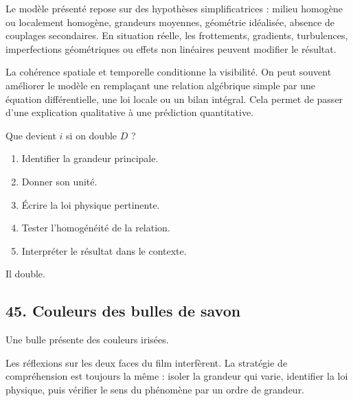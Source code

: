 \documentclass[11pt,a4paper]{article}
\begin{document}
\begin{attentionbox}
Le modèle présenté repose sur des hypothèses simplificatrices : milieu homogène ou localement homogène, grandeurs moyennes, géométrie idéalisée, absence de couplages secondaires. En situation réelle, les frottements, gradients, turbulences, imperfections géométriques ou effets non linéaires peuvent modifier le résultat.
\end{attentionbox}

\begin{approfondissementbox}
La cohérence spatiale et temporelle conditionne la visibilité.
On peut souvent améliorer le modèle en remplaçant une relation algébrique simple par une équation différentielle, une loi locale ou un bilan intégral. Cela permet de passer d'une explication qualitative à une prédiction quantitative.
\end{approfondissementbox}

\begin{exercicebox}
Que devient $i$ si on double $D$ ?
\begin{enumerate}
  \item Identifier la grandeur principale.
  \item Donner son unité.
  \item Écrire la loi physique pertinente.
  \item Tester l'homogénéité de la relation.
  \item Interpréter le résultat dans le contexte.
\end{enumerate}
\end{exercicebox}

\begin{corrigebox}[Indication]
Il double.
\end{corrigebox}


\subsection{45. Couleurs des bulles de savon}

\begin{exemplebox}
Une bulle présente des couleurs irisées.
\end{exemplebox}

\begin{methodebox}
Les réflexions sur les deux faces du film interfèrent.
La stratégie de compréhension est toujours la même : isoler la grandeur qui varie, identifier la loi physique, puis vérifier le sens du phénomène par un ordre de grandeur.
\end{methodebox}
\end{document}

